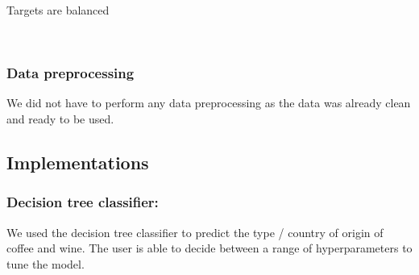 \documentclass[11pt]{article}
\begin{document}
    
    Targets are balanced


    \begin{center}
    \end{center}
    { \hspace*{\fill} \\}
    
    \subsubsection{Data preprocessing}\label{data-preprocessing}

We did not have to perform any data preprocessing as the data was
already clean and ready to be used.

    \subsection{Implementations}\label{implementations}

\subsubsection{Decision tree
classifier:}\label{decision-tree-classifier}

We used the decision tree classifier to predict the type / country of
origin of coffee and wine. The user is able to decide between a range of
hyperparameters to tune the model.
\end{document}
